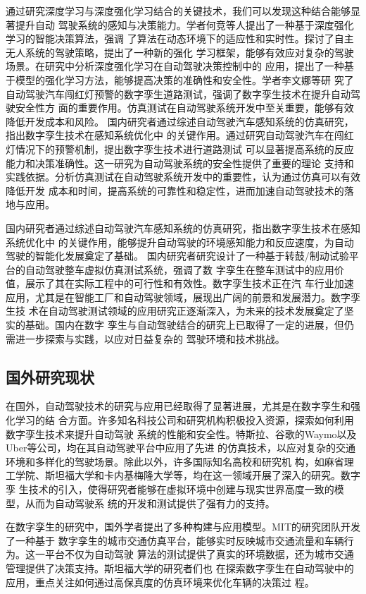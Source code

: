 通过研究深度学习与深度强化学习结合的关键技术，我们可以发现这种结合能够显著提升自动
驾驶系统的感知与决策能力。学者何竞等人提出了一种基于深度强化学习的智能决策算法，强调
了算法在动态环境下的适应性和实时性。探讨了自主无人系统的驾驶策略，提出了一种新的强化
学习框架，能够有效应对复杂的驾驶场景。在研究中分析深度强化学习在自动驾驶决策控制中的
应用，提出了一种基于模型的强化学习方法，能够提高决策的准确性和安全性。学者李文娜等研
究了自动驾驶汽车闯红灯预警的数字孪生道路测试，强调了数字孪生技术在提升自动驾驶安全性方
面的重要作用。仿真测试在自动驾驶系统开发中至关重要，能够有效降低开发成本和风险。
国内研究者通过综述自动驾驶汽车感知系统的仿真研究，指出数字孪生技术在感知系统优化中
的关键作用。通过研究自动驾驶汽车在闯红灯情况下的预警机制，提出数字孪生技术进行道路测试
可以显著提高系统的反应能力和决策准确性。这一研究为自动驾驶系统的安全性提供了重要的理论
支持和实践依据。分析仿真测试在自动驾驶系统开发中的重要性，认为通过仿真可以有效降低开发
成本和时间，提高系统的可靠性和稳定性，进而加速自动驾驶技术的落地与应用。

国内研究者通过综述自动驾驶汽车感知系统的仿真研究，指出数字孪生技术在感知系统优化中
的关键作用，能够提升自动驾驶的环境感知能力和反应速度，为自动驾驶的智能化发展奠定了基础。
国内研究者研究设计了一种基于转鼓/制动试验平台的自动驾驶整车虚拟仿真测试系统，强调了数
字孪生在整车测试中的应用价值，展示了其在实际工程中的可行性和有效性。数字孪生技术正在汽
车行业加速应用，尤其是在智能工厂和自动驾驶领域，展现出广阔的前景和发展潜力。数字孪生技
术在自动驾驶测试领域的应用研究正逐渐深入，为未来的技术发展奠定了坚实的基础。国内在数字
孪生与自动驾驶结合的研究上已取得了一定的进展，但仍需进一步探索与实践，以应对日益复杂的
驾驶环境和技术挑战。

\subsection{国外研究现状}

在国外，自动驾驶技术的研究与应用已经取得了显著进展，尤其是在数字孪生和强化学习的结
合方面。许多知名科技公司和研究机构积极投入资源，探索如何利用数字孪生技术来提升自动驾驶
系统的性能和安全性。特斯拉、谷歌的Waymo以及Uber等公司，均在其自动驾驶平台中应用了先进
的仿真技术，以应对复杂的交通环境和多样化的驾驶场景。除此以外，许多国际知名高校和研究机
构，如麻省理工学院、斯坦福大学和卡内基梅隆大学等，均在这一领域开展了深入的研究。数字孪
生技术的引入，使得研究者能够在虚拟环境中创建与现实世界高度一致的模型，从而为自动驾驶系
统的开发和测试提供了强有力的支持。

在数字孪生的研究中，国外学者提出了多种构建与应用模型。MIT的研究团队开发了一种基于
数字孪生的城市交通仿真平台，能够实时反映城市交通流量和车辆行为。这一平台不仅为自动驾驶
算法的测试提供了真实的环境数据，还为城市交通管理提供了决策支持。斯坦福大学的研究者们也
在探索数字孪生在自动驾驶中的应用，重点关注如何通过高保真度的仿真环境来优化车辆的决策过
程。

